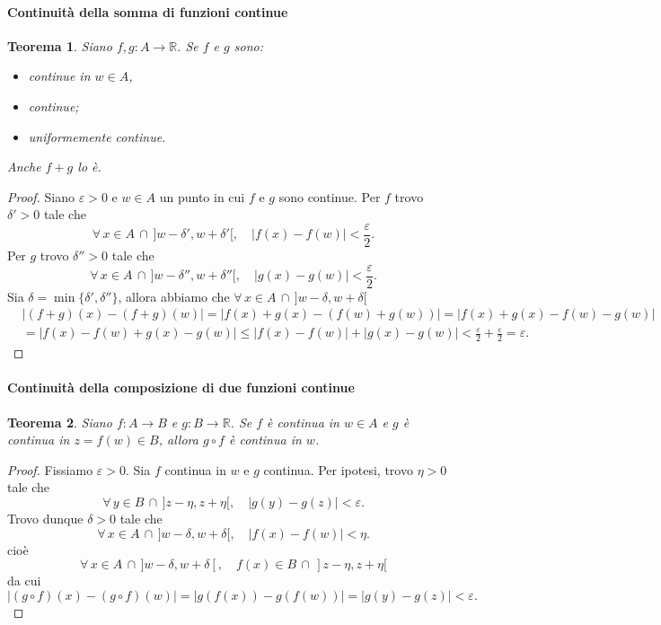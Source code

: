 \documentclass{article}
\theoremstyle{plain}
\newtheorem{thm}{Teorema}[section]
\theoremstyle{definition}
\theoremstyle{remark}
\begin{document}
\paragraph{Continuità della somma di funzioni continue}
\begin{bxthm}
\begin{thm}
    Siano $f,g:A\to\mathbb{R}$. Se $f$ e $g$ sono:
    \begin{itemize}
        \item continue in $w\in A$,
        \item continue;
        \item uniformemente continue.
    \end{itemize}
    Anche $f+g$ lo è.    
\end{thm}
\end{bxthm}
\begin{proof}
    Siano $\varepsilon>0$ e $w\in A$ un punto in cui $f$ e $g$ sono continue.
    Per $f$ trovo $\delta'>0$ tale che 
    \[\forall\, x\in A\,\cap\, ]w-\delta',w+\delta'[,\quad |f(x)-f(w)|<\dfrac{\varepsilon}{2}.\]
    Per $g$ trovo $\delta''>0$ tale che 
    \[\forall\, x\in A\,\cap\,]w-\delta'',w+\delta''[,\quad |g(x)-g(w)|<\dfrac{\varepsilon}{2}.\]
    Sia $\delta=\min\{\delta',\delta''\}$, allora abbiamo che $\forall\, x\in A\,\cap\, ]w-\delta,w+\delta[$
    \begin{align*}
        &|(f+g)(x)-(f+g)(w)|=|f(x)+g(x)-(f(w)+g(w))|=|f(x)+g(x)-f(w)-g(w)|\\
        &=|f(x)-f(w)+g(x)-g(w)|\leq |f(x)-f(w)|+|g(x)-g(w)|<\frac{\varepsilon}{2}+\frac{\varepsilon}{2}=\varepsilon.
    \end{align*}
\end{proof}

\vspace{10pt}

\paragraph{Continuità della composizione di due funzioni continue}
\begin{bxthm}
\begin{thm}
    Siano $f:A\to B$ e $g:B\to\mathbb{R}$. Se $f$ è continua in $w\in A$ e $g$ è continua in $z=f(w)\in B$,
    allora $g\circ f$ è continua in $w$.
\end{thm}
\end{bxthm}
\begin{proof}
        Fissiamo $\varepsilon>0$. Sia $f$ continua in $w$ e $g$ continua.
        Per ipotesi, trovo $\eta>0$ tale che 
        \[\forall\, y\in B\,\cap \,]z-\eta,z+\eta[,\quad|g(y)-g(z)|<\varepsilon.\]
        Trovo dunque $\delta>0$ tale che 
        \[\forall\, x\in A\,\cap\, ]w-\delta,w+\delta[,\quad|f(x)-f(w)|<\eta.\]
        cioè 
        \[\forall\, x\in A\,\cap\, ]w-\delta,w+\delta[,\quad f(x)\in B\,\cap\,]z-\eta,z+\eta[\]
        da cui 
        \[ |(g\circ f)(x)-(g\circ f)(w)|=|g(f(x))-g(f(w))|=|g(y)-g(z)|<\varepsilon.\]
\end{proof}
\end{document}
